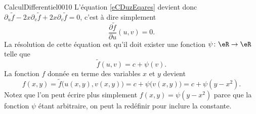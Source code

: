 \begin{corrige}{CalculDifferentiel0010}
	L'équation \eqref{eCDuzEqares} devient donc $\partial_u\tilde f-2x\partial_v\tilde f+2x\partial_v\tilde f=0$, c'est à dire simplement
	\begin{equation}
		\frac{ \partial \tilde f }{ \partial u }(u,v)=0.
	\end{equation}
	La résolution de cette équation est qu'il doit exister une fonction $\psi\colon \eR\to \eR$ telle que
	\begin{equation}
		\tilde f(u,v)=c+\psi(v).
	\end{equation}
	La fonction $f$ donnée en terme des variables $x$ et $y$ devient
	\begin{equation}
		f(x,y)=\tilde f\big( u(x,y),v(x,y) \big)=c+\psi\big( v(x,y) \big)=c+\psi(y-x^2).
	\end{equation}
	Notez que l'on peut écrire plus simplement $f(x,y)=\psi(y-x^2)$ parce que la fonction $\psi$ étant arbitraire, on peut la redéfinir pour inclure la constante.

\end{corrige}
